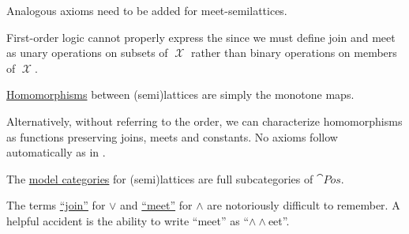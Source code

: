 \begin{definition}
\begin{thmenum}[resume=def:semilattice]
    Analogous axioms need to be added for meet-semilattices.

    First-order logic cannot properly express the  since we must define join and meet as unary operations on subsets of \( \mscrX \) rather than binary operations on members of \( \mscrX \).

     \hyperref[def:first_order_homomorphism]{Homomorphisms} between (semi)lattices are simply the monotone maps.

    Alternatively, without referring to the order, we can characterize homomorphisms as functions preserving joins, meets and constants. No axioms follow automatically as in .

     The \hyperref[def:first_order_model_category]{model categories} for (semi)lattices are full subcategories of \hyperref[def:poset/category]{\( \cat{Pos} \)}.
  \end{thmenum}
\end{definition}

\begin{remark}\label{rem:lattice_operation_etymology}
  The terms \hyperref[thm:binary_lattice_operations/join]{\enquote{join}} for \( \vee \) and \hyperref[thm:binary_lattice_operations/meet]{\enquote{meet}} for \( \wedge \) are notoriously difficult to remember. A helpful accident is the ability to write \enquote{meet} as \enquote{\( \wedge \wedge \)eet}.
\end{remark}

